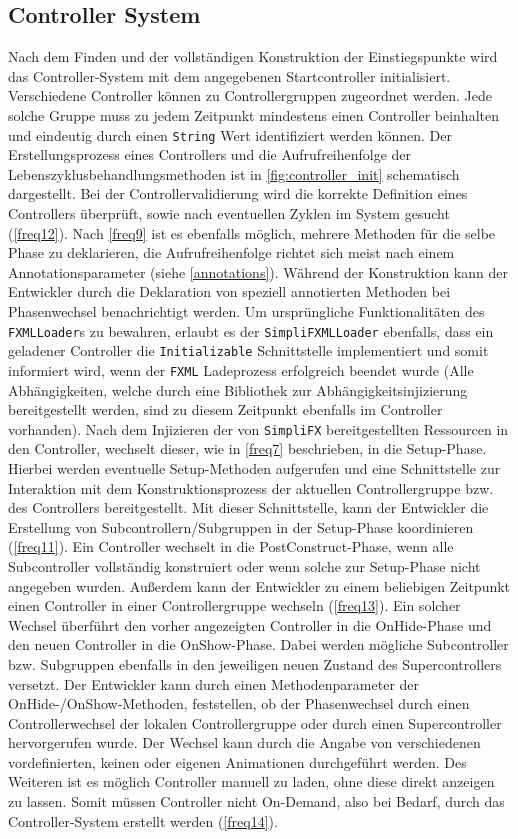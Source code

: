 \subsection{Controller System}
Nach dem Finden und der vollständigen Konstruktion der Einstiegspunkte wird das Controller-System mit dem angegebenen Startcontroller initialisiert. Verschiedene Controller können zu Controllergruppen zugeordnet werden. Jede solche Gruppe muss zu jedem Zeitpunkt mindestens einen Controller beinhalten und eindeutig durch einen \texttt{String} Wert identifiziert werden können. Der Erstellungsprozess eines Controllers und die Aufrufreihenfolge der Lebenszyklusbehandlungsmethoden ist in \autoref{fig:controller_init} schematisch dargestellt. Bei der Controllervalidierung wird die korrekte Definition eines Controllers überprüft, sowie nach eventuellen Zyklen im System gesucht (\autoref{freq12}). Nach \autoref{freq9} ist es ebenfalls möglich, mehrere Methoden für die selbe Phase zu deklarieren, die Aufrufreihenfolge richtet sich meist nach einem Annotationsparameter (siehe \autoref{annotations}). Während der Konstruktion kann der Entwickler durch die Deklaration von speziell annotierten Methoden bei Phasenwechsel benachrichtigt werden. Um ursprüngliche Funktionalitäten des \texttt{FXMLLoader}s zu bewahren, erlaubt es der \texttt{SimpliFXMLLoader} ebenfalls, dass ein geladener Controller die \texttt{Initializable} Schnittstelle implementiert und somit informiert wird, wenn der \texttt{FXML} Ladeprozess erfolgreich beendet wurde (Alle Abhängigkeiten, welche durch eine Bibliothek zur Abhängigkeitsinjizierung bereitgestellt werden, sind zu diesem Zeitpunkt ebenfalls im Controller vorhanden). Nach dem Injizieren der von \texttt{SimpliFX} bereitgestellten Ressourcen in den Controller, wechselt dieser, wie in \autoref{freq7} beschrieben, in die Setup-Phase. Hierbei werden eventuelle Setup-Methoden aufgerufen und eine Schnittstelle zur Interaktion mit dem Konstruktionsprozess der aktuellen Controllergruppe bzw. des Controllers bereitgestellt. Mit dieser Schnittstelle, kann der Entwickler die Erstellung von Subcontrollern/Subgruppen in der Setup-Phase koordinieren (\autoref{freq11}). Ein Controller wechselt in die PostConstruct-Phase, wenn alle Subcontroller vollständig konstruiert oder wenn solche zur Setup-Phase nicht angegeben wurden. Außerdem kann der Entwickler zu einem beliebigen Zeitpunkt einen Controller in einer Controllergruppe wechseln (\autoref{freq13}). Ein solcher Wechsel überführt den vorher angezeigten Controller in die OnHide-Phase und den neuen Controller in die OnShow-Phase. Dabei werden mögliche Subcontroller bzw. Subgruppen ebenfalls in den jeweiligen neuen Zustand des Supercontrollers versetzt. Der Entwickler kann durch einen Methodenparameter der OnHide-/OnShow-Methoden, feststellen, ob der Phasenwechsel durch einen Controllerwechsel der lokalen Controllergruppe oder durch einen Supercontroller hervorgerufen wurde. Der Wechsel kann durch die Angabe von verschiedenen vordefinierten, keinen oder eigenen Animationen durchgeführt werden. Des Weiteren ist es möglich Controller manuell zu laden, ohne diese direkt anzeigen zu lassen. Somit müssen Controller nicht On-Demand, also bei Bedarf, durch das Controller-System erstellt werden (\autoref{freq14}).

